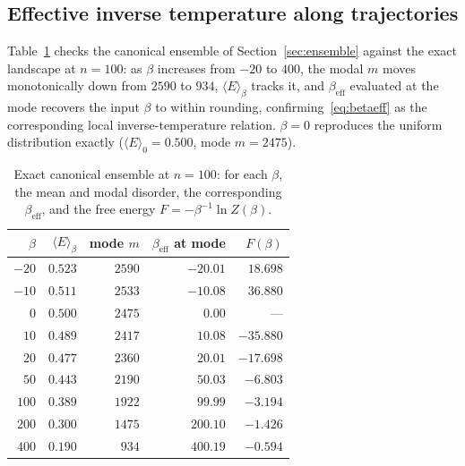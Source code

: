 \documentclass[10pt,journal]{IEEEtran}
\begin{document}
\subsection{Effective inverse temperature along trajectories}
\label{sec:res-temp}
Table~\ref{tab:ensemble} checks the canonical ensemble of Section~\ref{sec:ensemble} against the exact landscape at $n=100$: as $\beta$ increases from $-20$ to $400$, the modal $m$ moves monotonically down from $2590$ to $934$, $\langle E\rangle_\beta$ tracks it, and $\beta_{\mathrm{eff}}$ evaluated at the mode recovers the input $\beta$ to within rounding, confirming~\eqref{eq:betaeff} as the corresponding local inverse-temperature relation. $\beta=0$ reproduces the uniform distribution exactly ($\langle E\rangle_0=0.500$, mode $m=2475$).

\begin{table}[!t]
\centering
\caption{Exact canonical ensemble at $n=100$: for each $\beta$, the mean and modal disorder, the corresponding $\beta_{\mathrm{eff}}$, and the free energy $F=-\beta^{-1}\ln Z(\beta)$.}
\label{tab:ensemble}
\footnotesize
\setlength{\tabcolsep}{5pt}
\begin{tabular}{@{}rrrrr@{}}
\toprule
$\beta$ & $\langle E\rangle_\beta$ & mode $m$ & $\beta_{\mathrm{eff}}$ at mode & $F(\beta)$ \\
\midrule
$-20$ & $0.523$ & $2590$ & $-20.01$ & $18.698$ \\
$-10$ & $0.511$ & $2533$ & $-10.08$ & $36.880$ \\
$0$ & $0.500$ & $2475$ & $0.00$ & --- \\
$10$ & $0.489$ & $2417$ & $10.08$ & $-35.880$ \\
$20$ & $0.477$ & $2360$ & $20.01$ & $-17.698$ \\
$50$ & $0.443$ & $2190$ & $50.03$ & $-6.803$ \\
$100$ & $0.389$ & $1922$ & $99.99$ & $-3.194$ \\
$200$ & $0.300$ & $1475$ & $200.10$ & $-1.426$ \\
$400$ & $0.190$ & $934$ & $400.19$ & $-0.594$ \\
\bottomrule
\end{tabular}
\end{table}
\end{document}
